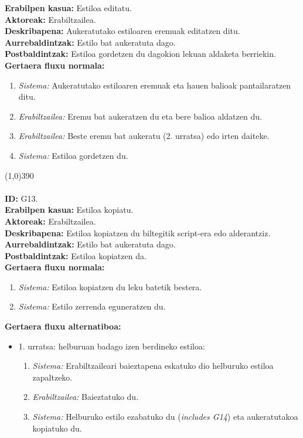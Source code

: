 \textbf{Erabilpen kasua:} Estiloa editatu.\\
\textbf{Aktoreak:} Erabiltzailea.\\
\textbf{Deskribapena:} Aukeratutako estiloaren eremuak editatzen ditu.\\
\textbf{Aurrebaldintzak:} Estilo bat aukeratuta dago.\\
\textbf{Postbaldintzak:} Estiloa gordetzen du dagokion lekuan aldaketa berriekin.\\
\textbf{Gertaera fluxu normala:}
\begin{enumerate}
	\item \textit{Sistema:} Aukeratutako estiloaren eremuak eta hauen balioak pantailaratzen ditu.
	\item \textit{Erabiltzailea:} Eremu bat aukeratzen du eta bere balioa aldatzen du.
	\item \textit{Erabiltzailea:} Beste eremu bat aukeratu (2. urratsa) edo irten daiteke.
	\item \textit{Sistema:} Estiloa gordetzen du.
\end{enumerate}
\line(1,0){390}\\
\noindent\\
\textbf{ID:} G13.\\
\textbf{Erabilpen kasua:} Estiloa kopiatu.\\
\textbf{Aktoreak:} Erabiltzailea.\\
\textbf{Deskribapena:} Estiloa kopiatzen du biltegitik script-era edo alderantziz.\\
\textbf{Aurrebaldintzak:} Estilo bat aukeratuta dago.\\
\textbf{Postbaldintzak:} Estiloa kopiatzen da.\\
\textbf{Gertaera fluxu normala:}
\begin{enumerate}
	\item \textit{Sistema:} Estiloa kopiatzen du leku batetik bestera.
	\item \textit{Sistema:} Estilo zerrenda eguneratzen du.
\end{enumerate}
\textbf{Gertaera fluxu alternatiboa:}
\begin{itemize}
	\item 1. urratsa: helburuan badago izen berdineko estiloa:
		\begin{enumerate}
		\item \textit{Sistema:} Erabiltzaileari baieztapena eskatuko dio helburuko estiloa zapaltzeko.
		\item \textit{Erabiltzailea:} Baieztatuko du.
		\item \textit{Sistema:} Helburuko estilo ezabatuko du (\textit{includes G14}) eta aukeratutakoa kopiatuko du.
		\end{enumerate}
\end{itemize}
